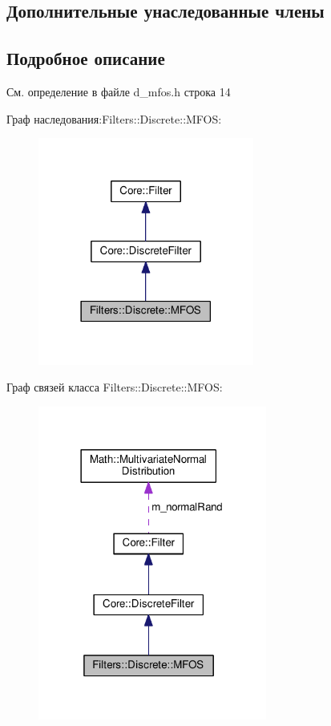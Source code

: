 \subsection*{Дополнительные унаследованные члены}


\subsection{Подробное описание}


См. определение в файле d\+\_\+mfos.\+h строка 14



Граф наследования\+:Filters\+:\+:Discrete\+:\+:M\+F\+OS\+:
\nopagebreak
\begin{figure}[H]
\begin{center}
\leavevmode
\includegraphics[width=201pt]{class_filters_1_1_discrete_1_1_m_f_o_s__inherit__graph}
\end{center}
\end{figure}


Граф связей класса Filters\+:\+:Discrete\+:\+:M\+F\+OS\+:
\nopagebreak
\begin{figure}[H]
\begin{center}
\leavevmode
\includegraphics[width=213pt]{class_filters_1_1_discrete_1_1_m_f_o_s__coll__graph}
\end{center}
\end{figure}



